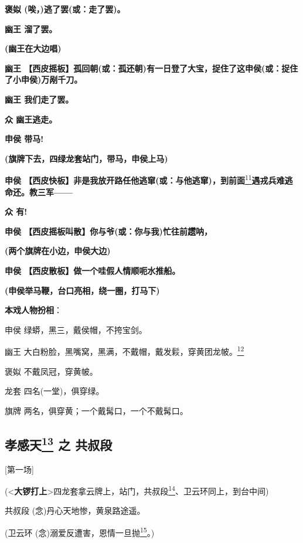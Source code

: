 \textbf{褒姒 (唉，)逃了罢(或：走了罢)。}

\textbf{幽王 溜了罢。}

\textbf{(幽王在大边唱)}

\textbf{幽王
【西皮摇板】孤回朝(或：孤还朝)有一日登了大宝，捉住了这申侯(或：捉住了小申侯)万剐千刀。}

\textbf{幽王 我们走了罢。}

\textbf{众 幽王逃走。}

\textbf{申侯 带马!}

\textbf{(旗牌下去，四绿龙套站门，带马，申侯上马)}

\textbf{申侯
【西皮快板】非是我放开路任他逃窜(或：与他逃窜)，到前面}\protect\hyperlink{fn11}{\textsuperscript{11}}\textbf{遇戎兵难逃命还。教三军------}

\textbf{众 有!}

\textbf{申侯 【西皮摇板叫散】你与爷(或：你与我)忙往前趱呐，}

\textbf{(两个旗牌在小边，申侯大边)}

\textbf{申侯 【西皮散板】做一个哇假人情顺呃水推船。}

\textbf{(申侯举马鞭，台口亮相，绕一圈，打马下)}

\textbf{本戏人物扮相}：

申侯 绿蟒，黑三，戴侯帽，不挎宝剑。

幽王
大白粉脸，黑嘴窝，黑满，不戴帽，戴发鬏，穿黄团龙帔。\protect\hyperlink{fn12}{\textsuperscript{12}}

褒姒 不戴凤冠，穿黄帔。

龙套 四名(一堂)，俱穿绿。

旗牌 两名，俱穿黄；一个戴髯口，一个不戴髯口。

\hypertarget{ux5b5dux611fux5929-ux4e4b-ux5171ux53d4ux6bb5}{%
\subsection{\texorpdfstring{孝感天\protect\hyperlink{fn13}{\textsuperscript{13}}
之
共叔段}{孝感天13 之 共叔段}}\label{ux5b5dux611fux5929-ux4e4b-ux5171ux53d4ux6bb5}}

{[}第一场{]}

(\textless{}\textbf{大锣打上}\textgreater{}四龙套拿云牌上，站门，共叔段\protect\hyperlink{fn14}{\textsuperscript{14}}、卫云环同上，到台中间)

共叔段 (念)丹心天地惨，黄泉路途遥。

(卫云环
(念)溺爱反遭害，恩情一旦抛\protect\hyperlink{fn15}{\textsuperscript{15}}。)

